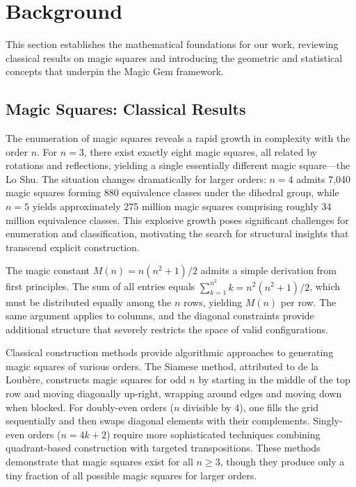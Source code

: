\section{Background}
\label{sec:background}

This section establishes the mathematical foundations for our work, 
reviewing classical results on magic squares and introducing the geometric and statistical concepts 
that underpin the Magic Gem framework.

\subsection{Magic Squares: Classical Results}

The enumeration of magic squares reveals a rapid growth in complexity with the order $n$.
For $n = 3$, there exist exactly eight magic squares, all related by rotations and reflections,
yielding a single essentially different magic square---the Lo Shu.
The situation changes dramatically for larger orders: 
$n = 4$ admits 7,040 magic squares forming 880 equivalence classes under the dihedral group,
while $n = 5$ yields approximately 275 million magic squares comprising roughly 34 million equivalence classes.
This explosive growth poses significant challenges for enumeration and classification,
motivating the search for structural insights that transcend explicit construction.

The magic constant $M(n) = n(n^2 + 1)/2$ admits a simple derivation from first principles.
The sum of all entries equals $\sum_{k=1}^{n^2} k = n^2(n^2 + 1)/2$,
which must be distributed equally among the $n$ rows, yielding $M(n)$ per row.
The same argument applies to columns, and the diagonal constraints provide additional structure
that severely restricts the space of valid configurations.

Classical construction methods provide algorithmic approaches to generating magic squares of various orders.
The Siamese method, attributed to de la Loubère, constructs magic squares for odd $n$
by starting in the middle of the top row and moving diagonally up-right,
wrapping around edges and moving down when blocked.
For doubly-even orders ($n$ divisible by 4), one fills the grid sequentially 
and then swaps diagonal elements with their complements.
Singly-even orders ($n = 4k + 2$) require more sophisticated techniques
combining quadrant-based construction with targeted transpositions.
These methods demonstrate that magic squares exist for all $n \geq 3$,
though they produce only a tiny fraction of all possible magic squares for larger orders.

